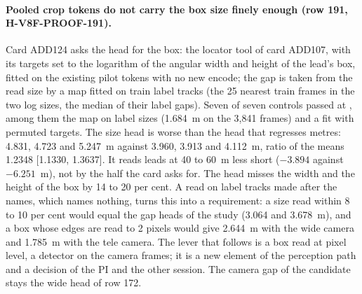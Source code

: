 \paragraph{Pooled crop tokens do not carry the box size finely enough (row 191, H-V8F-PROOF-191).} Card ADD124 asks the head for the box: the locator tool of card ADD107, with its targets set to the logarithm of the angular width and height of the lead's box, fitted on the existing pilot tokens with no new encode; the gap is taken from the read size by a map fitted on train label tracks (the 25 nearest train frames in the two log sizes, the median of their label gaps). Seven of seven controls passed at , among them the map on label sizes (1.684~m on the 3,841 frames) and a fit with permuted targets. The size head is worse than the head that regresses metres: 4.831, 4.723 and 5.247~m against 3.960, 3.913 and 4.112~m, ratio of the means 1.2348 [1.1330, 1.3637]. It reads leads at 40 to 60~m less short ($-3.894$ against $-6.251$~m), not by the half the card asks for. The head misses the width and the height of the box by 14 to 20 per cent. A read on label tracks made after the names, which names nothing, turns this into a requirement: a size read within 8 to 10 per cent would equal the gap heads of the study (3.064 and 3.678~m), and a box whose edges are read to 2 pixels would give 2.644~m with the wide camera and 1.785~m with the tele camera. The lever that follows is a box read at pixel level, a detector on the camera frames; it is a new element of the perception path and a decision of the PI and the other session. The camera gap of the candidate stays the wide head of row 172.

